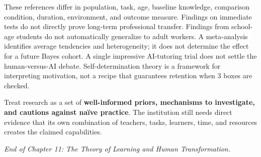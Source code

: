 These references differ in population, task, age, baseline knowledge, comparison condition, duration, environment, and outcome measure. Findings on immediate tests do not directly prove long-term professional transfer. Findings from school-age students do not automatically generalize to adult workers. A meta-analysis identifies average tendencies and heterogeneity; it does not determine the effect for a future Bayes cohort. A single impressive AI-tutoring trial does not settle the human-versus-AI debate. Self-determination theory is a framework for interpreting motivation, not a recipe that guarantees retention when 3 boxes are checked.

Treat research as a set of \textbf{well-informed priors, mechanisms to investigate, and cautions against naïve practice}. The institution still needs direct evidence that its own combination of teachers, tasks, learners, time, and resources creates the claimed capabilities.

\vspace{1.5em}
\noindent\emph{End of Chapter 11: The Theory of Learning and Human Transformation.}
